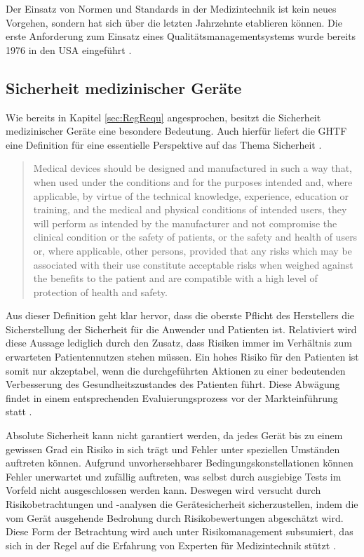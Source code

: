 \documentclass[a4paper,12pt]{report}
\begin{document}
Der Einsatz von Normen und Standards in der Medizintechnik ist kein neues Vorgehen, sondern hat sich über die letzten Jahrzehnte etablieren können. Die erste Anforderung zum Einsatz eines Qualitätsmanagementsystems wurde bereits 1976 in den USA eingeführt \citep[vgl.][S. 5]{Higson2002}.
\subsection{Sicherheit medizinischer Geräte}\label{subsec:Safety}
Wie bereits in Kapitel \ref{sec:RegRequ} angesprochen, besitzt die Sicherheit medizinischer Geräte eine besondere Bedeutung. Auch hierfür liefert die \ac{GHTF} eine Definition für eine essentielle Perspektive auf das Thema Sicherheit \citep[][S. 6]{GHTF2012b}.
\begin{quote}
Medical devices should be designed and manufactured in such a way that, when used under the conditions and for the purposes intended and, where applicable, by virtue of the technical knowledge, experience, education or training, and the medical and physical conditions of intended users, they will perform as intended by the manufacturer and not compromise the clinical condition or the safety of patients, or the safety and health of users or, where applicable, other persons, provided that any risks which may be associated with their use constitute acceptable risks when weighed against the benefits to the patient and are compatible with a high level of protection of health and safety.
\end{quote}
Aus dieser Definition geht klar hervor, dass die oberste Pflicht des Herstellers die Sicherstellung der Sicherheit für die Anwender und Patienten ist. Relativiert wird diese Aussage lediglich durch den Zusatz, dass Risiken immer im Verhältnis zum erwarteten Patientennutzen stehen müssen. Ein hohes Risiko für den Patienten ist somit nur akzeptabel, wenn die durchgeführten Aktionen zu einer bedeutenden Verbesserung des Gesundheitszustandes des Patienten führt. Diese Abwägung findet in einem entsprechenden Evaluierungsprozess vor der Markteinführung statt \citep[vgl.][S. 11]{Ramakrishna2015}. 

Absolute Sicherheit kann nicht garantiert werden, da jedes Gerät bis zu einem gewissen Grad ein Risiko in sich trägt und Fehler unter speziellen Umständen auftreten können. Aufgrund unvorhersehbarer Bedingungskonstellationen können Fehler unerwartet und zufällig auftreten, was selbst durch ausgiebige Tests im Vorfeld nicht ausgeschlossen werden kann. Deswegen wird versucht durch Risikobetrachtungen und -analysen die Gerätesicherheit sicherzustellen, indem die vom Gerät ausgehende Bedrohung durch Risikobewertungen abgeschätzt wird. Diese Form der Betrachtung wird auch unter Risikomanagement subsumiert, das sich in der Regel auf die Erfahrung von Experten für Medizintechnik stützt \citep[vgl.][S. 3]{Cheng2003}.
\end{document}

